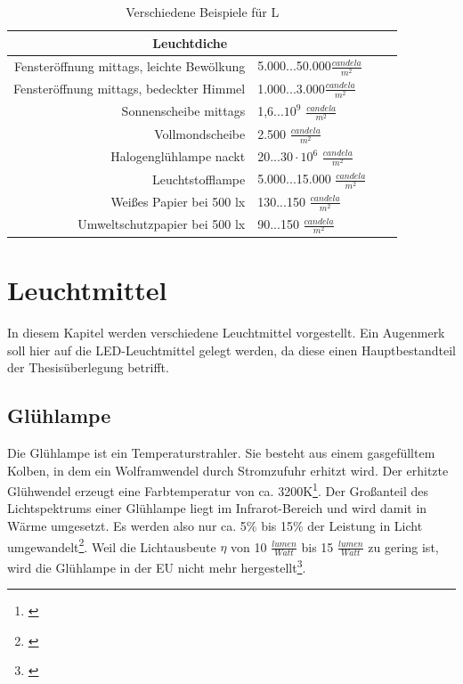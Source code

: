 \begin{table}[htp] 
		\centering
		\begin{tabular}{rlcc}  %
		\toprule
		\multicolumn{2}{c}{\large\sffamily Leuchtdiche}\\ 							
		\midrule
		Fensteröffnung mittags, leichte Bewölkung & 5.000...50.000$\frac{candela}{m^{2}}$\\
		Fensteröffnung mittags, bedeckter Himmel & 1.000...3.000$\frac{candela}{m^{2}}$\\
		Sonnenscheibe mittags & 1,6...$10^{9}$ $\frac{candela}{m^{2}}$\\
		Vollmondscheibe & 2.500 $\frac{candela}{m^{2}}$\\
		Halogenglühlampe nackt & 20...$30 \cdot 10^{6}$ $\frac{candela}{m^{2}}$\\
		Leuchtstofflampe & 5.000...15.000 $\frac{candela}{m^{2}}$\\
		Weißes Papier bei 500 lx & 130...150 $\frac{candela}{m^{2}}$\\
		Umweltschutzpapier bei 500 lx & 90...150 $\frac{candela}{m^{2}}$\\
		\bottomrule
		\end{tabular}
		\caption{Verschiedene Beispiele für L\protect\footnotemark}	
		\label{t_candelamm}
	\end{table}


\chapter{Leuchtmittel}
In diesem Kapitel werden verschiedene Leuchtmittel vorgestellt. Ein Augenmerk soll hier auf die LED-Leuchtmittel gelegt werden, da diese einen Hauptbestandteil der Thesisüberlegung betrifft.


\section{Glühlampe} \label{sec_glühlampe}
Die Glühlampe ist ein Temperaturstrahler. Sie besteht aus einem gasgefülltem Kolben, in dem ein Wolframwendel durch Stromzufuhr erhitzt wird. Der erhitzte Glühwendel erzeugt eine Farbtemperatur von ca. 3200K\footnote{\cite[137]{mueller}}. Der Großanteil des Lichtspektrums einer Glühlampe liegt im Infrarot-Bereich und wird damit in Wärme umgesetzt. Es werden also nur ca. 5\% bis 15\% der Leistung in Licht umgewandelt\footnote{\cite[78]{ris}}.
Weil die Lichtausbeute $\eta$ von 10 $\frac{lumen}{Watt}$ bis 15 $\frac{lumen}{Watt}$ zu gering ist, wird die Glühlampe in der EU nicht mehr hergestellt\footnote{\cite[78]{ris}}.
 
